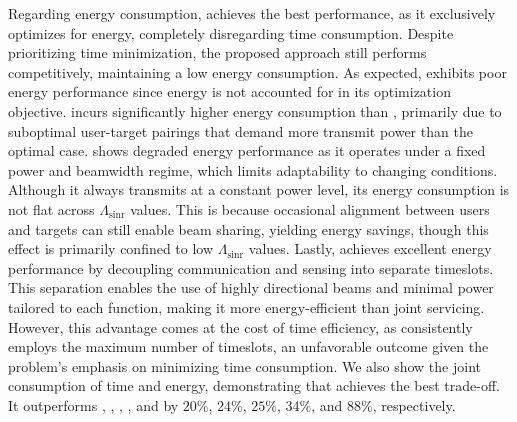 \documentclass[10pt,journal,compsoc]{IEEEtran}
\newcommand\mytextsf{\bfseries\sffamily\fontsize{9pt}{9pt}\selectfont}
\theoremstyle{myremark}
\theoremstyle{myexample}
\begin{document}
Regarding energy consumption, {\mytextsf{ELB}} achieves the best performance, as it exclusively optimizes for energy, completely disregarding time consumption. Despite prioritizing time minimization, the proposed approach {\mytextsf{OPT}} still performs competitively, maintaining a low energy consumption. As expected, {\mytextsf{TLB}} exhibits poor energy performance since energy is not accounted for in its optimization objective. {\mytextsf{BL1}} incurs significantly higher energy consumption than {\mytextsf{OPT}}, primarily due to suboptimal user-target pairings that demand more transmit power than the optimal case. {\mytextsf{BL2}} shows degraded energy performance as it operates under a fixed power and beamwidth regime, which limits adaptability to changing conditions. Although it always transmits at a constant power level, its energy consumption is not flat across $ \Lambda_{\mathrm{sinr}} $ values. This is because occasional alignment between users and targets can still enable beam sharing, yielding energy savings, though this effect is primarily confined to low $ \Lambda_{\mathrm{sinr}} $ values. Lastly, {\mytextsf{BL3}} achieves excellent energy performance by decoupling communication and sensing into separate timeslots. This separation enables the use of highly directional beams and minimal power tailored to each function, making it more energy-efficient than joint servicing. However, this advantage comes at the cost of time efficiency, as {\mytextsf{BL3}} consistently employs the maximum number of timeslots, an unfavorable outcome given the problem's emphasis on minimizing time consumption. We also show the joint consumption of time and energy, demonstrating that {\mytextsf{OPT}} achieves the best trade-off. It outperforms {\mytextsf{ELB}}, {\mytextsf{TLB}}, {\mytextsf{BL3}}, {\mytextsf{BL1}}, and {\mytextsf{BL2}} by $ 20\% $, $ 24\% $, $ 25\% $, $ 34\% $, and $ 88\% $, respectively.
\end{document}
